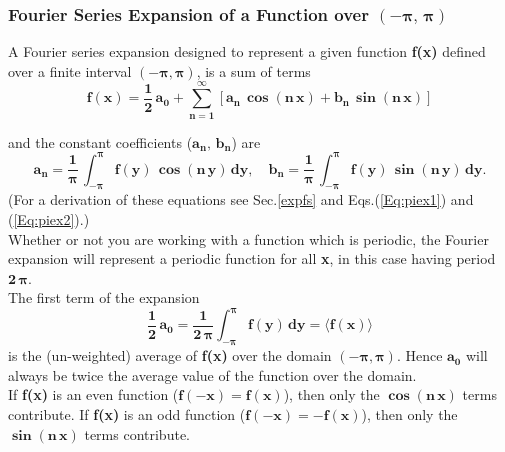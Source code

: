 \documentclass[12pt]{article}
\begin{document}
\subsubsection{Fourier Series Expansion of a Function over $(-\boldsymbol{\pi,\,\pi})$}
A Fourier series expansion designed to represent a given function
  \textbf{f(x)} defined over a finite interval $(-\boldsymbol{\pi, \pi})$, is a sum of terms
\begin{equation}  \label{fxpi}
\mathbf{f(x) = \frac{1}{2} \, a_{0} + \sum_{n=1}^{\infty} \left[ 
   a_{n}\,\boldsymbol{\cos} (n\,x) + b_{n} \,\boldsymbol{\sin} (n\,x) \right] }
\end{equation}
  
\noindent and the constant coefficients ($\mathbf{a_{n},\, b_{n}}$) are 
\begin{equation} \label{fcoeff}
 \mathbf{ a_{n} = \frac{1}{\boldsymbol{\pi}} \, \int_{-\boldsymbol{\pi}}^{\boldsymbol{\pi}} f(y)\,
   \boldsymbol{\cos} (n\,y) \, dy}, \quad
   \mathbf{ b_{n} = \frac{1}{\boldsymbol{\pi}} \, \int_{-\boldsymbol{\pi}}^{\boldsymbol{\pi}} f(y)\,
   \boldsymbol{\sin} (n\,y) \, dy}. 
\end{equation}
(For a derivation of these equations see Sec.\ref{expfs} and Eqs.(\ref{Eq:piex1}) and
  (\ref{Eq:piex2}).)\\

\noindent Whether or not you are working with a function which is periodic, the Fourier
  expansion will represent a periodic function for all \textbf{x}, in this case
  having period $\boldsymbol{2\,\pi}$.\\

\noindent The first term of the expansion
\begin{equation}
\mathbf{ \frac{1}{2} \, a_0  =
 \frac{1}{2\, \boldsymbol{\pi}}  \int_{-\boldsymbol{\pi}}^{\boldsymbol{\pi}} f(y)\,dy =
 \langle f(x) \rangle }
\end{equation}
is the (un-weighted) average of \textbf{f(x)} over the domain $(-\boldsymbol{\pi},\boldsymbol{\pi})$.
Hence $\mathbf{a_{0}}$ will always be twice the average value of the function over
  the domain.\\

\noindent If \textbf{f(x)} is an even function ($\mathbf{f(-x) =  f(x)}$),
  then only the $\mathbf{\boldsymbol{\cos}(n\,x)}$ terms
  contribute. 
If \textbf{f(x)} is an odd function ($\mathbf{f(-x) =  -f(x)}$),
  then only the $\mathbf{\boldsymbol{\sin}(n\,x)}$ terms contribute. \\
  
\end{document}
